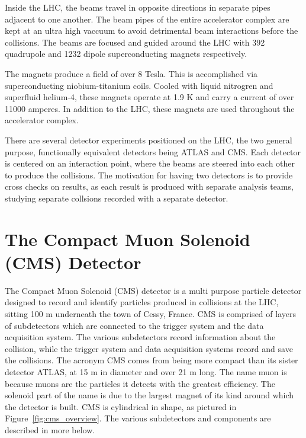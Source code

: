 Inside the LHC, the beams travel in opposite directions in separate pipes adjacent to
one another. The beam pipes of the entire accelerator complex are kept at an ultra high vaccuum
to avoid detrimental beam interactions before the collisions. The beams are focused
and guided around the LHC with 392 quadrupole and 1232 dipole superconducting
magnets respectively.

The magnets produce a field of over 8 Tesla. This is accomplished via superconducting 
niobium-titanium coils. Cooled with liquid nitrogren and superfluid helium-4, these
magnets operate at 1.9 K and carry a current of over 11000 amperes. In addition to
the LHC, these magnets are used throughout the accelerator complex.

There are several detector experiments positioned on the LHC, the two general purpose, functionally equivalent detectors being ATLAS and CMS.
Each detector is centered on an interaction point, where the beams are steered into each other to produce the collisions. 
The motivation for having two detectors is to provide cross checks on results, as each result is produced with separate analysis teams, studying separate collsions
recorded with a separate detector.   

\section{The Compact Muon Solenoid (CMS) Detector}
The Compact Muon Solenoid (CMS) detector is a multi purpose particle detector designed to record and identify particles produced in collisions at the LHC, sitting 100 m underneath
the town of Cessy, France. CMS is comprised of layers of subdetectors which are connected to the trigger system and the data acquisition system.
The various subdetectors record information about the collision, while the trigger system and
data acquisition systems record and save the collisions. The acronym CMS comes from being more compact than its sister detector ATLAS, at 15 m in diameter and
over 21 m long. The name muon is because muons are the particles it detects with the greatest efficiency. The solenoid part of the name is due to the largest magnet of its kind
around which the detector is built. CMS is cylindrical in shape, as pictured in Figure~\ref{fig:cms_overview}. The various subdetectors and components are described in more
below. 

